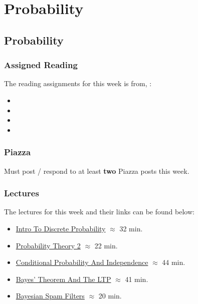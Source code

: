 \clearpage

\renewcommand{\ChapTitle}{Probability}
\renewcommand{\SectionTitle}{Probability}

\chapter{\ChapTitle}
\section{\SectionTitle}

\subsection{Assigned Reading}

The reading assignments for this week is from, \Textbook:

\begin{itemize}
    \item {}
    \item {}
    \item {}
    \item {}
\end{itemize}

\subsection{Piazza}

Must post / respond to at least \textbf{two} Piazza posts this week.

\subsection{Lectures}

The lectures for this week and their links can be found below:

\begin{itemize}
    \item \href{https://applied.cs.colorado.edu/mod/hvp/view.php?id=51840}{Intro To Discrete Probability} $\approx$ 32 min.
    \item \href{https://applied.cs.colorado.edu/mod/hvp/view.php?id=51841}{Probability Theory 2} $\approx$ 22 min.
    \item \href{https://applied.cs.colorado.edu/mod/hvp/view.php?id=51842}{Conditional Probability And Independence} $\approx$ 44 min.
    \item \href{https://applied.cs.colorado.edu/mod/hvp/view.php?id=51843}{Bayes' Theorem And The LTP} $\approx$ 41 min.
    \item \href{https://applied.cs.colorado.edu/mod/hvp/view.php?id=51844}{Bayesian Spam Filters} $\approx$ 20 min.
\end{itemize}

